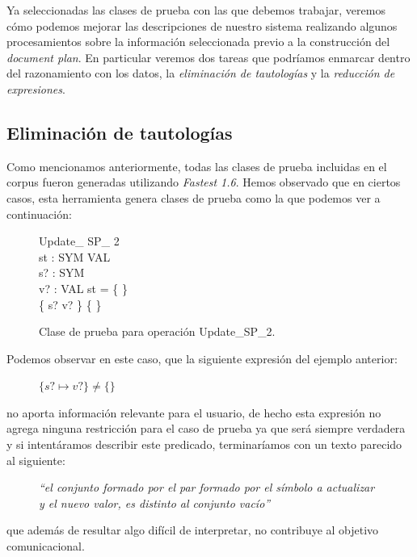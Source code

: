 Ya seleccionadas las clases de prueba con las que debemos trabajar, veremos cómo podemos mejorar las descripciones de nuestro sistema realizando algunos procesamientos sobre la información seleccionada previo a la construcción del \textit{document plan}. En particular veremos dos tareas que podríamos enmarcar dentro del razonamiento con los datos, la \emph{eliminación de tautologías} y la \emph{reducción de expresiones}. 

\subsection*{Eliminación de tautologías}
Como mencionamos anteriormente, todas las clases de prueba incluidas en el corpus fueron generadas utilizando \emph{Fastest 1.6}. Hemos observado que en ciertos casos, esta herramienta genera clases de prueba como la que podemos ver a continuación:

\begin{figure}[H]
  \centering
\begin{schema}{Update\_ SP\_ 2}\\
 st : SYM \pfun VAL \\
 s? : SYM \\
 v? : VAL 
\where
 st = \{ \} \\
 \{ s? \mapsto v? \} \neq \{ \}
\end{schema}
  \caption{Clase de prueba para operación Update\_SP\_2.}
  \label{fig:ej_update_sp_2}
\end{figure}

Podemos observar en este caso, que la siguiente expresión del ejemplo anterior:

\begin{figure}[H]
  \centering
  $\{ s? \mapsto v? \} \neq \{ \}$ 
\end{figure}

\noindent
no aporta información relevante para el usuario, de hecho esta expresión no agrega ninguna restricción para el caso de prueba ya que será siempre verdadera y si intentáramos describir este predicado, terminaríamos con un texto parecido al siguiente:

\begin{figure}[H]
  \centering
  \emph{``el conjunto formado por el par formado por el símbolo a actualizar y el nuevo valor, es distinto al conjunto vacío''}
\end{figure}

\noindent
que además de resultar algo difícil de interpretar, no contribuye al objetivo comunicacional.

